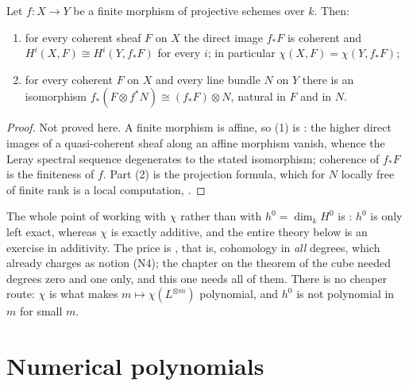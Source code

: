 \begin{proposition}
\label{prop:deg-euler-finite-morphism}
Let $f\colon X\to Y$ be a finite morphism of projective schemes over $k$.
Then:
\begin{enumerate}
  \item for every coherent sheaf $F$ on $X$ the direct image $f_*F$ is coherent
  and $H^i(X,F)\cong H^i(Y,f_*F)$ for every $i$; in particular
  $\chi(X,F)=\chi(Y,f_*F)$;
  \item for every coherent $F$ on $X$ and every line bundle $N$ on $Y$ there
  is an isomorphism $f_*(F\otimes f^*N)\cong(f_*F)\otimes N$, natural in $F$
  and in $N$.
\end{enumerate}
\end{proposition}
\begin{proof}
Not proved here.  A finite morphism is affine, so (1) is
\cite[III, \S4 and \S8]{Hartshorne}: the higher direct images
of a quasi-coherent sheaf along an affine morphism vanish, whence the Leray
spectral sequence degenerates to the stated isomorphism; coherence of $f_*F$
is the finiteness of $f$.  Part (2) is the projection formula, which for $N$
locally free of finite rank is a local computation, \cite[II, \S5]{Hartshorne}.
\end{proof}

\begin{remark}\label{rem:deg-why-chi}
The whole point of working with $\chi$ rather than with
$h^0=\dim_kH^0$ is : $h^0$ is only left exact,
whereas $\chi$ is exactly additive, and the entire theory below is an exercise
in additivity.  The price is
, that is, cohomology in \emph{all}
degrees, which  already charges as notion (N4); the
chapter on the theorem of the cube needed degrees zero and one only, and this
one needs all of them.  There is no cheaper route: $\chi$ is what makes
$m\mapsto\chi(L^{\otimes m})$ polynomial, and $h^0$ is not polynomial in $m$
for small $m$.
\end{remark}

\section{Numerical polynomials}\label{sec:deg-numerical}

